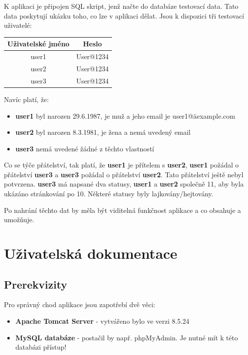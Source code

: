 \documentclass[
12pt,
a4paper,
pdftex,
czech,
titlepage
]{report}
\begin{document}
K aplikaci je připojen SQL skript, jenž načte do databáze testovací data. Tato data poskytují ukázku toho, co lze v aplikaci dělat. Jsou k dispozici tři testovací uživatelé:

\begin{center}
\begin{tabular}{| c | c | }
\hline
	\textbf{Uživatelské jméno} & \textbf{Heslo} \\
	\hline
  user1 & User@1234  \\
  \hline
  user2 & User@1234  \\
  \hline
  user3 & User@1234  \\
  \hline
\end{tabular}
\end{center}

Navíc platí, že:
\begin{itemize}
\item \textbf{user1} byl narozen 29.6.1987, je muž a jeho email je user1@ăexample.com
\item \textbf{user2} byl narozen 8.3.1981, je žena a nemá uvedený email
\item \textbf{user3} nemá uvedené žádné z těchto vlastností
\end{itemize}

Co se týče přátelství, tak platí, že \textbf{user1} je přítelem s \textbf{user2}, \textbf{user1} požádal o přátelství \textbf{user3} a \textbf{user3} požádal o přátelství \textbf{user2}. Tato přátelství ještě nebyl potvrzena. \textbf{user3} má napsané dva statusy, \textbf{user1} a \textbf{user2} společně 11, aby byla ukázáno stránkování po 10. Některé statusy byly lajkovány/hejtovány.

Po nahrání těchto dat by měla být viditelná funkčnost aplikace a co obsahuje a umožňuje.

\chapter{Uživatelská dokumentace}

\section{Prerekvizity}

Pro správný chod aplikace jsou zapotřebí dvě věci:
\begin{itemize}
\item \textbf{Apache Tomcat Server} - vytvářeno bylo ve verzi 8.5.24
\item \textbf{MySQL databáze} - postačil by např. phpMyAdmin. Je nutné mít k této databázi přístup!
\end{itemize}
\end{document}
